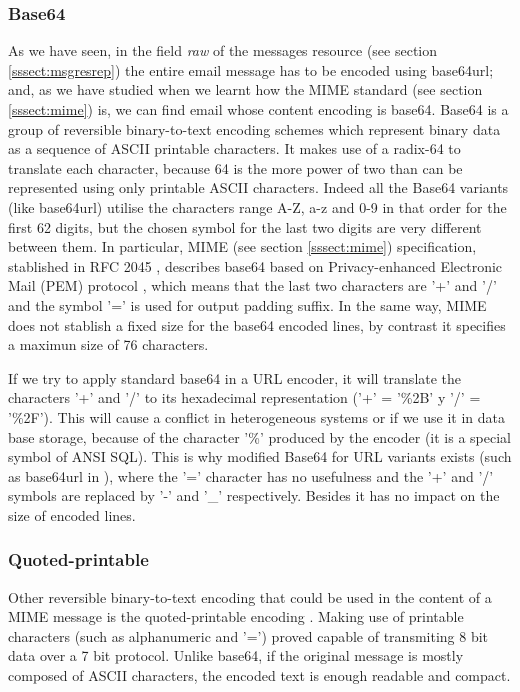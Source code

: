 \subsubsection{Base64} \label{sssect:base64}
As we have seen, in the field \textit{raw} of the messages resource (see section \ref{sssect:msgresrep}) the entire email message has to be encoded using base64url; and, as we have studied when we learnt how the MIME standard (see section \ref{sssect:mime}) is, we can find email whose content encoding is base64. Base64 \citep{wikibase64, rfc4648} is a group of reversible binary-to-text encoding schemes which represent binary data as a sequence of ASCII printable characters. It makes use of a radix-64 to translate each character, because 64 is the more power of two than can be represented using only printable ASCII characters. Indeed all the Base64 variants (like base64url) utilise the characters range A-Z, a-z and 0-9 in that order for the first 62 digits, but the chosen symbol for the last two digits are very different between them. In particular, MIME (see section \ref{sssect:mime}) specification, stablished in RFC 2045 \citep{rfc2045}, describes base64 based on  Privacy-enhanced Electronic Mail (PEM) protocol \citep{wikipem, rfc7468}, which means that the last two characters are '+' and '/' and the symbol '=' is used for output padding suffix. In the same way, MIME does not stablish a fixed size for the base64 encoded lines, by contrast it specifies a maximun size of 76 characters.

If we try to apply standard base64 in a URL encoder, it will translate the characters '+' and '/' to its hexadecimal representation ('+' = '\%2B' y '/' = '\%2F'). This will cause a conflict in heterogeneous systems or if we use it in data base storage, because of the character '\%' produced by the encoder (it is a special symbol of ANSI SQL). This is why modified Base64 for URL variants exists (such as base64url in \cite{rfc4648}), where the '=' character has no usefulness and the '+' and '/' symbols are replaced by '-' and '\_' respectively. Besides it has no impact on the size of encoded lines.

\subsubsection{Quoted-printable} \label{sssect:quot-p}
Other reversible binary-to-text encoding that could be used in the content of a MIME message is the quoted-printable encoding \citep{wikiquotprint, rfc1521}. Making use of printable characters (such as alphanumeric and '=') proved capable of transmiting 8 bit data over a 7 bit protocol. Unlike base64, if the original message is mostly composed of ASCII characters, the encoded text is enough readable and compact.

